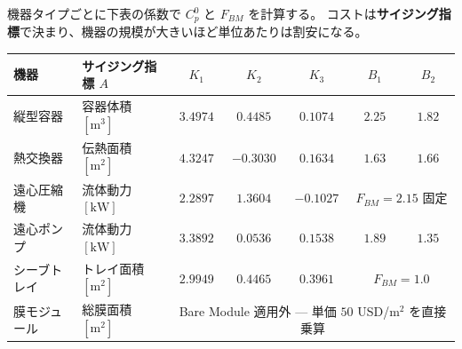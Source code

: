 \begin{frame}[t]

  \vspace*{1.2mm}
  {\footnotesize 機器タイプごとに下表の係数で $C_p^0$ と $F_{BM}$ を計算する。
   コストは\textbf{サイジング指標}で決まり、機器の規模が大きいほど単位あたりは割安になる。}\par

  \vspace{0.7em}
  \centering
  {\scriptsize\setlength{\tabcolsep}{5pt}\renewcommand{\arraystretch}{1.32}%
   \begin{tabular}{@{}l l c c c c c@{}}
     \toprule
     機器 & サイジング指標 $A$ & $K_1$ & $K_2$ & $K_3$ & $B_1$ & $B_2$ \\
     \midrule
     縦型容器     & 容器体積 $[\mathrm{m^3}]$  & $3.4974$ & $0.4485$  & $0.1074$ & $2.25$ & $1.82$ \\
     熱交換器     & 伝熱面積 $[\mathrm{m^2}]$  & $4.3247$ & $-0.3030$ & $0.1634$ & $1.63$ & $1.66$ \\
     遠心圧縮機   & 流体動力 $[\mathrm{kW}]$   & $2.2897$ & $1.3604$  & $-0.1027$ & \multicolumn{2}{c}{$F_{BM}=2.15$ 固定} \\
     遠心ポンプ   & 流体動力 $[\mathrm{kW}]$   & $3.3892$ & $0.0536$  & $0.1538$ & $1.89$ & $1.35$ \\
     シーブトレイ & トレイ面積 $[\mathrm{m^2}]$ & $2.9949$ & $0.4465$  & $0.3961$ & \multicolumn{2}{c}{$F_{BM}=1.0$} \\
     膜モジュール & 総膜面積 $[\mathrm{m^2}]$  & \multicolumn{5}{c}{Bare Module 適用外 — 単価 $50$ USD/m$^2$ を直接乗算} \\
     \bottomrule
   \end{tabular}}\par

  \vspace{0.9em}


\end{frame}
